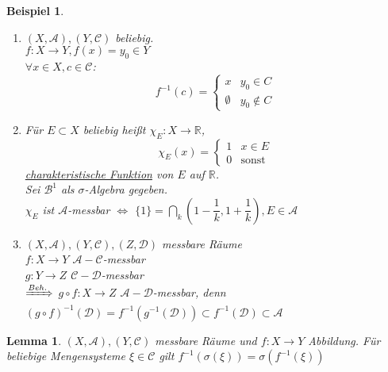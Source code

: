 \documentclass[11pt]{memoir}
\theoremstyle{changebreak}
\newtheorem{Beispiel}{Beispiel}[chapter]
\newtheorem{Lemma}{Lemma}[chapter]
\begin{document}
\begin{Beispiel}

\begin{enumerate}
	\item $(X, \mathscr{A}), (Y, \mathscr{C})$ beliebig. \\
	$f: X \rightarrow Y, f(x) = y_0 \in Y$ \\
	$\forall x \in X, c \in \mathscr{C}$:
	\begin{equation}
		f^{-1}(c) =
		\begin{cases}
			x & y_0 \in C \\
			\emptyset & y_0 \notin C
		\end{cases}
	\end{equation}
	\item Für $E \subset X$ beliebig heißt $\chi_E: X \rightarrow \mathbb{R}$, \\
	\begin{equation}
		\chi_E(x) =
		\begin{cases}
			1 & x \in E \\
			0 & \text{sonst}
		\end{cases}
	\end{equation}
	\underline{charakteristische Funktion} von $E$ auf $\mathbb{R}$. \\
	Sei $\mathscr{B}^1$ als $\sigma$-Algebra gegeben. \\
	$\chi_E$ ist $\mathscr{A}$-messbar $\Leftrightarrow$ $\{1\} = \bigcap\limits_k \left(1- \dfrac{1}{k}, 1 + \dfrac{1}{k}\right), E \in \mathscr{A}$
	\item $(X, \mathscr{A}), (Y, \mathscr{C}), (Z, \mathscr{D})$ messbare Räume \\
	$f: X \rightarrow Y$ $ \mathscr{A}-\mathscr{C}$-messbar \\
	$g: Y \rightarrow Z$ $ \mathscr{C}-\mathscr{D}$-messbar \\
	$\xRightarrow{Beh.}$ $  g \circ f: X \rightarrow Z$ $ \mathscr{A}-\mathscr{D}$-messbar, denn \\
	$(g \circ f)^{-1}(\mathscr{D}) = f^{-1}(g^{-1}(\mathscr{D})) \subset f^{-1}(\mathscr{D}) \subset \mathscr{A}$
\end{enumerate}
\end{Beispiel}

\begin{Lemma}
$(X, \mathscr{A}), (Y, \mathscr{C})$ messbare Räume und $f: X \rightarrow Y$ Abbildung. Für beliebige Mengensysteme $\xi \in \mathscr{C}$ gilt $f^{-1}(\sigma(\xi)) = \sigma(f^{-1}(\xi))$
\end{Lemma}
\end{document}
